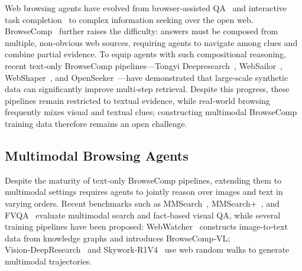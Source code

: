 \documentclass[11pt]{article}
\begin{document}
Web browsing agents have evolved from browser‑assisted QA~\citep{nakano2021webgpt} and interactive task completion~\citep{yao2022webshop,deng2023mind2web,zhou2023webarena} to complex information seeking over the open web. 
BrowseComp~\citep{wei2025browsecomp} further raises the difficulty: answers must be composed from multiple, non‑obvious web sources, requiring agents to navigate among clues and combine partial evidence. 
To equip agents with such compositional reasoning, recent text‑only BrowseComp pipelines—Tongyi Deepresearch~\citep{team2025tongyi}, WebSailor~\citep{li2025websailor}, WebShaper~\citep{tao2025webshaper}, and OpenSeeker~\citep{du2026openseeker}—have demonstrated that large‑scale synthetic data can significantly improve multi‑step retrieval. 
Despite this progress, these pipelines remain restricted to textual evidence, while real‑world browsing frequently mixes visual and textual clues; constructing multimodal BrowseComp training data therefore remains an open challenge.


\subsection{Multimodal Browsing Agents}
Despite the maturity of text‑only BrowseComp pipelines, extending them to multimodal settings requires agents to jointly reason over images and text in varying orders. 
Recent benchmarks such as MMSearch~\citep{jiang2024mmsearch}, MMSearch+~\citep{tao2025mmsearch}, and FVQA~\citep{wu2025mmsearch} evaluate multimodal search and fact‑based visual QA, while several training pipelines have been proposed: WebWatcher~\citep{geng2025webwatcher} constructs image‑to‑text data from knowledge graphs and introduces BrowseComp‑VL; Vision‑DeepResearch~\citep{zeng2026vision} and Skywork‑R1V4~\citep{zhang2025skywork} use web random walks to generate multimodal trajectories.
\end{document}
